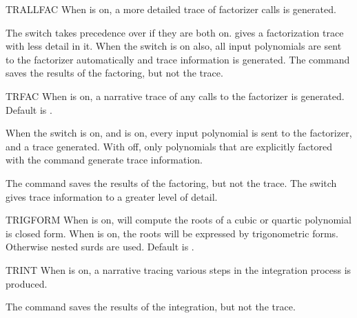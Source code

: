 \begin{Switch}[trallfac]{TRALLFAC}
When  is on, a more detailed trace of factorizer calls is
generated.

\begin{Comments}
The  switch takes precedence over  if they are
both on.  gives a factorization trace with less detail in it.
When the  switch is on also, all input polynomials are sent to
the factorizer automatically and trace information is generated.  The
 command saves the results of the factoring, but not the trace.
\end{Comments}
\end{Switch}


\begin{Switch}[trfac]{TRFAC}
When  is on, a narrative trace of any calls to the factorizer is
generated.  Default is .

\begin{Comments}
When the switch  is on, and  is on, every input
polynomial is sent to the factorizer, and a trace generated.  With
 off, only polynomials that are explicitly factored with the
command  generate trace information.

The  command saves the results of the factoring, but not
the trace.  The  switch gives trace information to a
greater level of detail.
\end{Comments}
\end{Switch}

\begin{Switch}[trigform]{TRIGFORM}
When  is on,  will compute the
roots of a cubic or quartic polynomial is closed form. When 
 is on, the roots will be expressed by trigonometric
forms. Otherwise nested surds are used. Default is .
\end{Switch}


\begin{Switch}[trint]{TRINT}
When  is on, a narrative tracing various steps in the
integration process is produced.

\begin{Comments}
The  command saves the results of the integration, but not the
trace.
\end{Comments}
\end{Switch}

